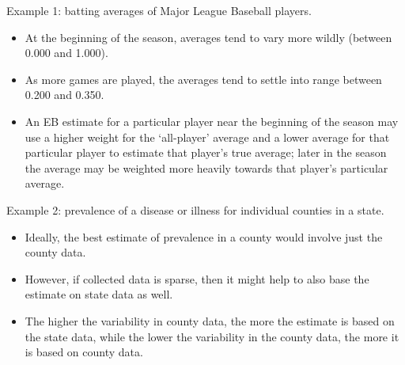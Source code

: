 \documentclass[
  9pt,
  ignorenonframetext,
]{beamer}
\begin{document}
\begin{frame}{}
\protect\hypertarget{section}{}
\begin{block}{Example 1: batting averages of Major League Baseball
players.}
\protect\hypertarget{example-1-batting-averages-of-major-league-baseball-players.}{}
\begin{itemize}
\item
  At the beginning of the season, averages tend to vary more wildly
  (between 0.000 and 1.000).
\item
  As more games are played, the averages tend to settle into range
  between 0.200 and 0.350.
\item
  An EB estimate for a particular player near the beginning of the
  season may use a higher weight for the `all-player' average and a
  lower average for that particular player to estimate that player's
  true average; later in the season the average may be weighted more
  heavily towards that player's particular average.
\end{itemize}
\end{block}
\end{frame}

\begin{frame}{}
\protect\hypertarget{section-1}{}
\begin{block}{Example 2: prevalence of a disease or illness for
individual counties in a state.}
\protect\hypertarget{example-2-prevalence-of-a-disease-or-illness-for-individual-counties-in-a-state.}{}
\begin{itemize}
\item
  Ideally, the best estimate of prevalence in a county would involve
  just the county data.
\item
  However, if collected data is sparse, then it might help to also base
  the estimate on state data as well.
\item
  The higher the variability in county data, the more the estimate is
  based on the state data, while the lower the variability in the county
  data, the more it is based on county data.
\end{itemize}
\end{block}
\end{frame}
\end{document}
